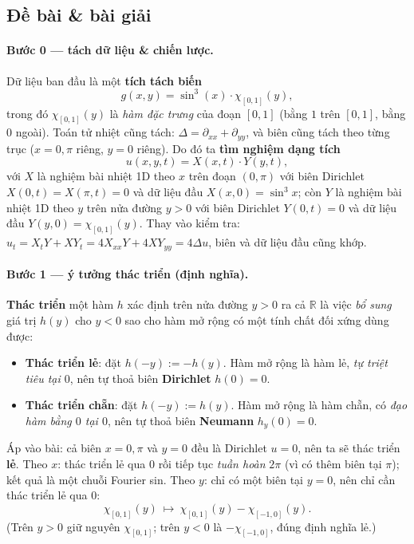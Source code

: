 \subsection*{Đề bài \& bài giải}
\paragraph{Bước 0 --- tách dữ liệu \& chiến lược.}\leavevmode

Dữ liệu ban đầu là một \textbf{tích tách biến}
\[
  g(x,y)=\sin^3(x)\cdot\chi_{[0,1]}(y),
\]
trong đó $\chi_{[0,1]}(y)$ là \emph{hàm đặc trưng} của đoạn $[0,1]$ (bằng $1$ trên $[0,1]$, bằng $0$ ngoài). Toán tử nhiệt cũng tách: $\Delta=\partial_{xx}+\partial_{yy}$, và biên cũng tách theo từng trục ($x=0,\pi$ riêng, $y=0$ riêng). Do đó ta \textbf{tìm nghiệm dạng tích}
\[
  u(x,y,t)=X(x,t)\cdot Y(y,t),
\]
với $X$ là nghiệm bài nhiệt 1D theo $x$ trên đoạn $(0,\pi)$ với biên Dirichlet $X(0,t)=X(\pi,t)=0$ và dữ liệu đầu $X(x,0)=\sin^3 x$; còn $Y$ là nghiệm bài nhiệt 1D theo $y$ trên nửa đường $y>0$ với biên Dirichlet $Y(0,t)=0$ và dữ liệu đầu $Y(y,0)=\chi_{[0,1]}(y)$. Thay vào kiểm tra: $u_t=X_t Y+XY_t=4X_{xx}Y+4XY_{yy}=4\Delta u$, biên và dữ liệu đầu cũng khớp.

\paragraph{Bước 1 --- ý tưởng thác triển (định nghĩa).}\leavevmode

\textbf{Thác triển} một hàm $h$ xác định trên nửa đường $y>0$ ra cả $\mathbb R$ là việc \emph{bổ sung} giá trị $h(y)$ cho $y<0$ sao cho hàm mở rộng có một tính chất đối xứng dùng được:
\begin{itemize}
  \item \textbf{Thác triển lẻ}: đặt $h(-y):=-h(y)$. Hàm mở rộng là hàm lẻ, \emph{tự triệt tiêu tại $0$}, nên tự thoả biên \textbf{Dirichlet} $h(0)=0$.
  \item \textbf{Thác triển chẵn}: đặt $h(-y):=h(y)$. Hàm mở rộng là hàm chẵn, có \emph{đạo hàm bằng $0$ tại $0$}, nên tự thoả biên \textbf{Neumann} $h_y(0)=0$.
\end{itemize}
Áp vào bài: cả biên $x=0,\pi$ và $y=0$ đều là Dirichlet $u=0$, nên ta sẽ thác triển \textbf{lẻ}. Theo $x$: thác triển lẻ qua $0$ rồi tiếp tục \emph{tuần hoàn} $2\pi$ (vì có thêm biên tại $\pi$); kết quả là một chuỗi Fourier sin. Theo $y$: chỉ có một biên tại $y=0$, nên chỉ cần thác triển lẻ qua $0$:
\[
  \chi_{[0,1]}(y)\ \longmapsto\ \chi_{[0,1]}(y)-\chi_{[-1,0]}(y).
\]
(Trên $y>0$ giữ nguyên $\chi_{[0,1]}$; trên $y<0$ là $-\chi_{[-1,0]}$, đúng định nghĩa lẻ.)


